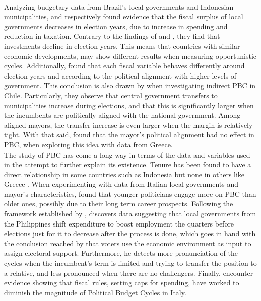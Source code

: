 \\
Analyzing budgetary data from Brazil's local governments and Indonesian municipalities, \textcite{sarukai2010} and \textcite{setiawan2017} respectively found evidence that the fiscal surplus of local governments decreases in election years, due to increase in spending and reduction in taxation. Contrary to the findings of \textcite{veiga2007} and \textcite{drazen2010}, they find that investments decline in election years. This means that countries with similar economic developments, may show different results when measuring opportunistic cycles. Additionally, \textcite{sarukai2010} found that each fiscal variable behaves differently around election years and according to the political alignment with higher levels of government. This conclusion is also drawn by \textcite{corvalan2018} when investigating indirect PBC in Chile. Particularly, they observe that central government transfers to municipalities increase during elections, and that this is significantly larger when the incumbents are politically aligned with the national government. Among aligned mayors, the transfer increase is even larger when the margin is relatively tight. With that said, \textcite{chortareas2016} found that the mayor's political alignment had no effect in PBC, when exploring this idea with data from Greece.
\\
The study of PBC has come a long way in terms of the data and variables used in the attempt to further explain its existence. Tenure has been found to have a direct relationship in some countries such as Indonesia \parencite{sarukai2010} but none in others like Greece \parencite{chortareas2016}. When experimenting with data from Italian local governments and mayor ́s characteristics, \textcite{alesina2018} found that younger politicians engage more on PBC than older ones, possibly due to their long term career prospects. Following the framework established by \textcite{nordhaus1975}, \textcite{labonne2016} discovers data suggesting that local governments from the Philippines shift expenditure to boost employment the quarters before elections just for it to decrease after the process is done, which goes in hand with the conclusion reached by \textcite{alfaro2019} that voters use the economic environment as input to assign electoral support. Furthermore, he detects more pronunciation of the cycles when the incumbent’s term is limited and trying to transfer the position to a relative, and less pronounced when there are no challengers. Finally, \textcite{bonfatti2019} encounter evidence showing that fiscal rules, setting caps for spending, have worked to diminish the magnitude of Political Budget Cycles in Italy.
